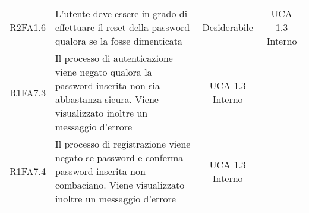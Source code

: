 {\begin{longtable}{ c C{4cm} c c}
R2FA1.6 & L'utente deve essere in grado di effettuare il reset della password qualora se la fosse dimenticata & Desiderabile & UCA 1.3 Interno\\

R1FA7.3 & Il processo di autenticazione viene negato qualora la password inserita non sia abbastanza sicura. Viene visualizzato inoltre un messaggio d'errore & UCA 1.3 Interno\\

R1FA7.4 & Il processo di registrazione viene negato se password e conferma password inserita non combaciano. Viene visualizzato inoltre un messaggio d'errore & UCA 1.3 Interno\\





\end{longtable}
}